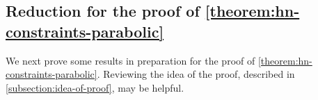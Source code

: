 \subsection{Reduction for the proof of \autoref{theorem:hn-constraints-parabolic}}
\label{subsection:proving-hn}
We next prove some results in preparation for the proof of
\autoref{theorem:hn-constraints-parabolic}.
Reviewing the idea of the proof, described in \autoref{subsection:idea-of-proof},
may be helpful.
%
%
